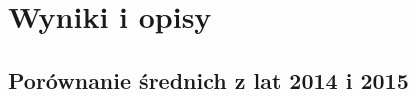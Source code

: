 \section*{Wyniki i opisy}

\subsection*{Porównanie średnich z lat 2014 i 2015}

\begin{verbatim}



\end{verbatim}




